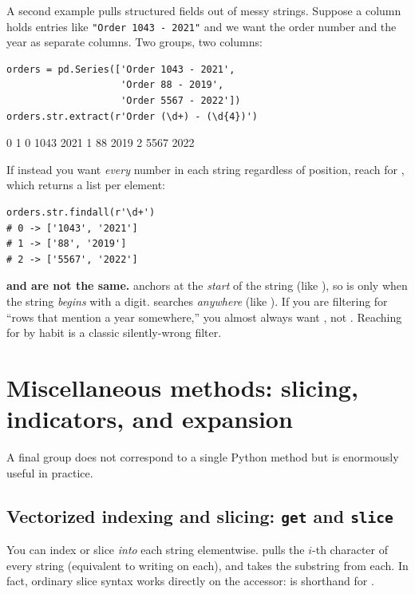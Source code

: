 \documentclass[11pt]{article}
\begin{document}
A second example pulls structured fields out of messy strings. Suppose a column holds entries like \verb!"Order 1043 - 2021"! and we want the order number and the year as separate columns. Two groups, two columns:

\begin{lstlisting}
orders = pd.Series(['Order 1043 - 2021',
                    'Order 88 - 2019',
                    'Order 5567 - 2022'])
orders.str.extract(r'Order (\d+) - (\d{4})')
\end{lstlisting}

\begin{outblock}
      0     1
0  1043  2021
1    88  2019
2  5567  2022
\end{outblock}

If instead you want \emph{every} number in each string regardless of position, reach for , which returns a list per element:

\begin{lstlisting}
orders.str.findall(r'\d+')
# 0 -> ['1043', '2021']
# 1 -> ['88', '2019']
# 2 -> ['5567', '2022']
\end{lstlisting}

\begin{pitfall}
\textbf{ and  are not the same.}  anchors at the \emph{start} of the string (like ), so  is  only when the string \emph{begins} with a digit.  searches \emph{anywhere} (like ). If you are filtering for ``rows that mention a year somewhere,'' you almost always want , not . Reaching for  by habit is a classic silently-wrong filter.
\end{pitfall}

\section{Miscellaneous methods: slicing, indicators, and expansion}

A final group does not correspond to a single Python  method but is enormously useful in practice.

\subsection{Vectorized indexing and slicing: \texttt{get} and \texttt{slice}}

You can index or slice \emph{into} each string elementwise.  pulls the $i$-th character of every string (equivalent to writing  on each), and  takes the substring  from each. In fact, ordinary slice syntax works directly on the accessor:  is shorthand for .
\end{document}
